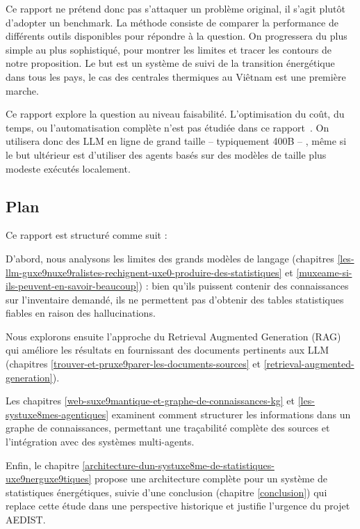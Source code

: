 \documentclass[a4paper,11pt]{report}
\begin{document}
Ce rapport ne prétend donc pas s'attaquer un problème original, il s'agit plutôt d'adopter un benchmark. La méthode consiste de comparer la performance de différents outils disponibles pour répondre à la question. On progressera du plus simple au plus sophistiqué, pour montrer les limites et tracer les contours de notre proposition. Le but est un système de suivi de la transition énergétique dans tous les pays, le cas des centrales thermiques au Viêtnam est une première marche.

Ce rapport explore la question au niveau faisabilité. L'optimisation du coût, du temps, ou l'automatisation complète n'est pas étudiée dans ce rapport~. On utilisera donc des LLM en ligne de grand taille -- typiquement 400B -- , même si le but ultérieur est d'utiliser des agents basés sur des modèles de taille plus modeste exécutés localement.

\subsection{Plan}\label{plan}

Ce rapport est structuré comme suit :

D'abord, nous analysons les limites des grands modèles de langage (chapitres \ref{les-llm-guxe9nuxe9ralistes-rechignent-uxe0-produire-des-statistiques} et \ref{muxeame-si-ils-peuvent-en-savoir-beaucoup}) : bien qu'ils puissent contenir des connaissances sur l'inventaire demandé, ils ne permettent pas d'obtenir des tables statistiques fiables en raison des hallucinations.

Nous explorons ensuite l'approche du Retrieval Augmented Generation (RAG) qui améliore les résultats en fournissant des documents pertinents aux LLM (chapitres \ref{trouver-et-pruxe9parer-les-documents-sources} et \ref{retrieval-augmented-generation}).

Les chapitres \ref{web-suxe9mantique-et-graphe-de-connaissances-kg} et \ref{les-systuxe8mes-agentiques} examinent comment structurer les informations dans un graphe de connaissances, permettant une traçabilité complète des sources et l'intégration avec des systèmes multi-agents.

Enfin, le chapitre \ref{architecture-dun-systuxe8me-de-statistiques-uxe9nerguxe9tiques} propose une architecture complète pour un système de statistiques énergétiques, suivie d'une conclusion (chapitre \ref{conclusion}) qui replace cette étude dans une perspective historique et justifie l'urgence du projet AEDIST.
\end{document}
